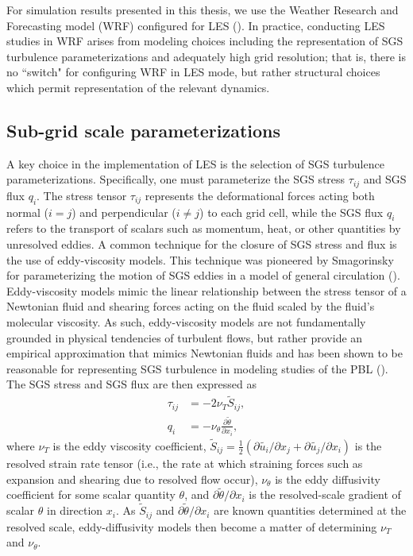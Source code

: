 For simulation results presented in this thesis, we use the Weather Research and Forecasting model (WRF) configured for LES (\cite{skamarock_description_2008}). In practice, conducting LES studies in WRF arises from modeling choices including the representation of SGS turbulence parameterizations and adequately high grid resolution; that is, there is no ``switch" for configuring WRF in LES mode, but rather structural choices which permit representation of the relevant dynamics. 

\subsection{Sub-grid scale parameterizations}
A key choice in the implementation of LES is the selection of SGS turbulence parameterizations. Specifically, one must parameterize the SGS stress $\tau_{ij}$ and SGS flux $q_i$. The stress tensor $\tau_{ij}$ represents the deformational forces acting both normal ($i=j$) and perpendicular ($i\neq j$) to each grid cell, while the SGS flux $q_i$ refers to the transport of scalars such as momentum, heat, or other quantities by unresolved eddies. A common technique for the closure of SGS stress and flux is the use of eddy-viscosity models. This technique was pioneered by Smagorinsky for parameterizing the motion of SGS eddies in a model of general circulation (\cite{smagorinsky_general_1963}). Eddy-viscosity models mimic the linear relationship between the stress tensor of a Newtonian fluid and shearing forces acting on the fluid scaled by the fluid's molecular viscosity. As such, eddy-viscosity models are not fundamentally grounded in physical tendencies of turbulent flows, but rather provide an empirical approximation that mimics Newtonian fluids and has been shown to be reasonable for representing SGS turbulence in modeling studies of the PBL (\cite{stoll_large-eddy_2020}). The SGS stress and SGS flux are then expressed as 
\begin{align}
\tau_{ij} &= -2\nu_T \tilde{S}_{ij},\\
q_i &= -\nu_{\theta}\frac{\partial \tilde{\theta}}{\partial x_i}, 
\end{align}
where $\nu_T$ is the eddy viscosity coefficient, $\tilde{S}_{ij} = \frac{1}{2} (\partial\tilde{u_i}/\partial x_j + \partial\tilde{u_j}/\partial x_i )$ is the resolved strain rate tensor (i.e., the rate at which straining forces such as expansion and shearing due to resolved flow occur), $\nu_{\theta}$ is the eddy diffusivity coefficient for some scalar quantity $\theta$, and $\partial \tilde{\theta} / \partial x_i$ is the resolved-scale gradient of scalar $\theta$ in direction $x_i$. As $\tilde{S}_{ij}$ and $\partial \tilde{\theta} / \partial x_i$ are known quantities determined at the resolved scale, eddy-diffusivity models then become a matter of determining $\nu_T$ and $\nu_{\theta}$. 

